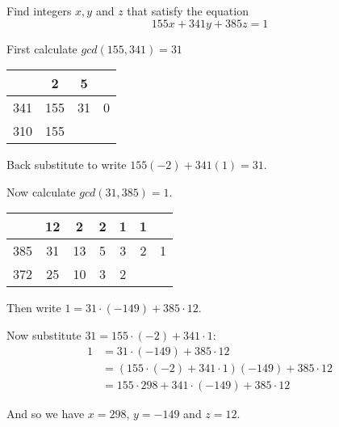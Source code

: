 \begin{example}
    Find integers $x, y$ and $z$ that satisfy the equation
    \[155x + 341y + 385z = 1 \]
    
    First calculate $gcd(155, 341) = 31$
    \begin{table}[H]
    \centering
    \begin{tabular}{c|c|c|c}
            & 2   & 5  &   \\ \hline
        341 & 155 & 31 & 0 \\ \hline
        310 & 155 &    & 
    \end{tabular}
    \end{table}
    
    Back substitute to write $155(-2) + 341(1)= 31$.
    
    Now calculate $gcd(31, 385) = 1$.
     \begin{table}[H]
    \centering
    \begin{tabular}{c|c|c|c|c|c|c}
            & 12  & 2   & 2  & 1  & 1  &   \\ \hline
        385 & 31  & 13  & 5  & 3  & 2  & 1 \\ \hline
        372 & 25  & 10  & 3  & 2  &    & 
    \end{tabular}
    \end{table}
    
    Then write $1 =  31 \cdot (-149) + 385 \cdot 12 $.
    
    Now substitute $31 = 155 \cdot (-2) + 341 \cdot 1$:
    \begin{align*}
        1 &= 31 \cdot (-149) + 385 \cdot 12 \\
          &= (155 \cdot (-2) + 341 \cdot 1) (-149) + 385 \cdot 12 \\
          &= 155 \cdot 298 + 341 \cdot (-149) + 385 \cdot 12
    \end{align*} 
    
    And so we have $x = 298$, $y = -149$ and $z = 12$.
    
\end{example}